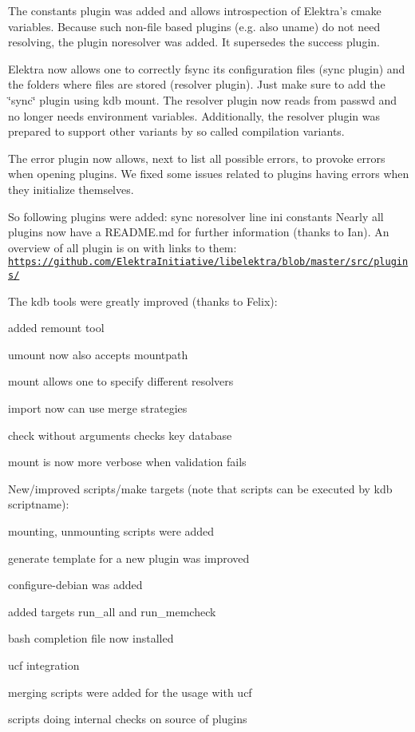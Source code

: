 The constants plugin was added and allows introspection of Elektra's cmake variables. Because such non-\/file based plugins (e.\+g. also uname) do not need resolving, the plugin noresolver was added. It supersedes the success plugin.

Elektra now allows one to correctly fsync its configuration files (sync plugin) and the folders where files are stored (resolver plugin). Just make sure to add the \char`\"{}sync\char`\"{} plugin using kdb mount. The resolver plugin now reads from passwd and no longer needs environment variables. Additionally, the resolver plugin was prepared to support other variants by so called compilation variants.

The error plugin now allows, next to list all possible errors, to provoke errors when opening plugins. We fixed some issues related to plugins having errors when they initialize themselves.

So following plugins were added\+: sync noresolver line ini constants Nearly all plugins now have a R\+E\+A\+D\+M\+E.\+md for further information (thanks to Ian). An overview of all plugin is on with links to them\+: \href{https://github.com/ElektraInitiative/libelektra/blob/master/src/plugins/}{\tt https\+://github.\+com/\+Elektra\+Initiative/libelektra/blob/master/src/plugins/}

The kdb tools were greatly improved (thanks to Felix)\+:
\begin{DoxyItemize}
\item added remount tool
\item umount now also accepts mountpath
\item mount allows one to specify different resolvers
\item import now can use merge strategies
\item check without arguments checks key database
\item mount is now more verbose when validation fails
\end{DoxyItemize}

New/improved scripts/make targets (note that scripts can be executed by kdb scriptname)\+:
\begin{DoxyItemize}
\item mounting, unmounting scripts were added
\item generate template for a new plugin was improved
\item configure-\/debian was added
\item added targets run\+\_\+all and run\+\_\+memcheck
\item bash completion file now installed
\item ucf integration
\item merging scripts were added for the usage with ucf
\item scripts doing internal checks on source of plugins
\end{DoxyItemize}

